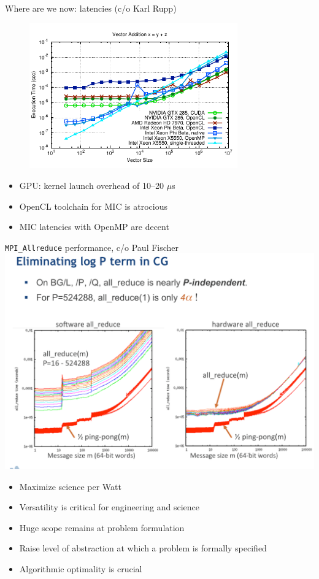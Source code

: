 \documentclass{beamer}
\begin{document}
\begin{frame}{Where are we now: latencies (c/o Karl Rupp)}
  \begin{figure}
    \centering
    \includegraphics[width=0.8\textwidth]{figures/hardware/karlrupp-vector-timings-7}
  \end{figure}
  \vspace{-1em}
  \begin{itemize}
  \item GPU: kernel launch overhead of 10--20 $\mu$s
  \item OpenCL toolchain for MIC is atrocious
  \item MIC latencies with OpenMP are decent
  \end{itemize}
\end{frame}

\begin{frame}{\texttt{MPI\_Allreduce} performance, c/o Paul Fischer}
  \includegraphics[width=\textwidth]{figures/hardware/FischerBGQAllReduce.png}
\end{frame}

\begin{frame}\LARGE
  \begin{itemize}
  \item Maximize science per Watt
  \item Versatility is critical for engineering and science
  \item Huge scope remains at problem formulation
  \item Raise level of abstraction at which a problem is formally specified
  \item Algorithmic optimality is crucial
  \end{itemize}
\end{frame}
\end{document}
